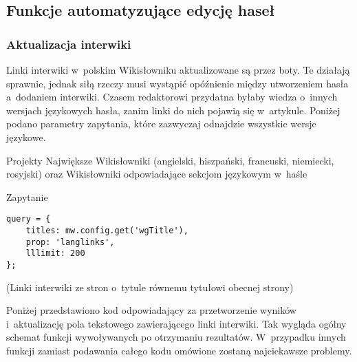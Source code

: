 \subsection{Funkcje automatyzujące edycję haseł}

\subsubsection{Aktualizacja interwiki}
Linki interwiki w~polskim Wikisłowniku aktualizowane są przez boty. Te działają sprawnie, jednak siłą rzeczy musi wystąpić opóźnienie między utworzeniem hasła a~dodaniem interwiki. Czasem redaktorowi przydatna byłaby wiedza o~innych wersjach językowych hasła, zanim linki do nich pojawią się w~artykule. Poniżej podano parametry zapytania, które zazwyczaj odnajdzie wszystkie wersje językowe.

\begin{opis}
\item[Projekty] Największe Wikisłowniki (angielski, hiszpański, francuski, niemiecki, rosyjski) oraz Wikisłowniki odpowiadające sekcjom językowym w~haśle
\item[Zapytanie]
\begin{verbatim}
query = {
	titles: mw.config.get('wgTitle'),
	prop: 'langlinks',
	lllimit: 200
};
\end{verbatim}
(Linki interwiki ze stron o~tytule równemu tytułowi obecnej strony)
\end{opis}

Poniżej przedstawiono kod odpowiadający za przetworzenie wyników i~aktualizację pola tekstowego zawierającego linki interwiki. Tak wygląda ogólny schemat funkcji wywoływanych po otrzymaniu rezultatów. W~przypadku innych funkcji zamiast podawania całego kodu omówione zostaną najciekawsze problemy.

